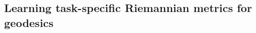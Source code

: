 \documentclass{article}
\theoremstyle{plain}
\newtheorem{theorem}{Theorem}[section]
\theoremstyle{definition}
\theoremstyle{remark}
\newcommand{\xin}[1]{\textcolor{teal}{[XS: #1]}}
\begin{document}
\begin{comment}
        I(\phi)=&\mathbb E_{\phi}\left[\left(\frac{\partial \log(p(\mathbf x;\phi))}{\partial \phi}\right)\left(\frac{\partial \log(p(\mathbf x;\phi))}{\partial \phi}\right)^T\right]\\
    \end{align}
    we have $I(\phi)=\frac{\partial\theta}{\partial\phi}^TI(\theta)\frac{\partial\theta}{\partial\phi}.$
\end{theorem}
that if we can control the \sout{KL-divergence} \xin{zero-th order diffence such as KL divergence does not guarantee this matching. We need first order difference, which can be approximated by matching local distances.} between the original and reparametrized probability distributions, we can control the error between the Fisher information metrics:
\begin{theorem}
    For $\phi=\phi(\theta)$ and $q(\mathbf x;\phi)$, if $\big|\big|\frac{\partial \log q(\mathbf x;\phi)}{\partial \phi}-\left(\frac{\partial\theta}{\partial\phi}\right)^T\frac{\partial \log p(\mathbf x;\theta)}{\partial \theta}\big|\big|<\epsilon$, 
    We have $||I(\phi)-\frac{\partial\theta}{\partial\phi}^TI(\theta)\frac{\partial\theta}{\partial\phi}||_2\leq C\epsilon^2$ for some constant $C>0.$\xin{[TODO] prove.}
\end{theorem}
\begin{align}
    L^{AM}=\frac{1}{n}\sum_{i}\Big|\Big|\frac{\partial \log(p(x_i))}{\partial x_i}-\left(\frac{\partial z}{\partial x_i}\right)^T\frac{\partial \log(q(z_i))}{\partial z}\Big|\Big|^2
\end{align}
Because the function $p(x_i)$ is not differentiable (due to the usage of non-isotropic kernel and other tricks), we approximate the derivatives with the differences when the points are close to each other. 
\begin{align}
    L^{AM}\approx\frac{1}{n}\sum_{i<j}I\{d_{ij}<\epsilon\}\Big|\Big|{|\log(p(x_i))-\log(p(x_j))|}-{|\log(q(z_i))-\log(q(z_j))|}\Big|\Big|^2
\end{align}
\par We further apply the exponential decay-weighted loss with tunable $\alpha$.
\begin{align}
    L^{WAM}=\frac{1}{n}\sum_{i<j}e^{-\alpha d_{ij}}\Big|\Big|{|\log(p(x_i))-\log(p(x_j))|}-{|\log(q(z_i))-\log(q(z_j))|}\Big|\Big|^2
\end{align}
}
\end{comment}

\subsection{Learning task-specific Riemannian metrics for geodesics}
\end{document}

